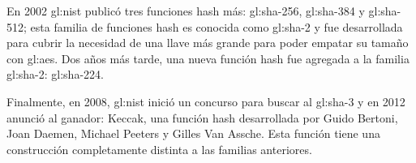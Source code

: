 En 2002 \acrshort{gl:nist} publicó tres funciones hash más:
\acrshort{gl:sha}-256, \acrshort{gl:sha}-384 y \acrshort{gl:sha}-512; esta
familia de funciones hash es conocida como \acrshort{gl:sha}-2 y fue
desarrollada para cubrir la necesidad de una llave más grande para poder
empatar su tamaño con \acrshort{gl:aes}. Dos años más tarde, una nueva
función hash fue agregada a la familia \acrshort{gl:sha}-2:
\acrshort{gl:sha}-224.

Finalmente, en 2008, \acrshort{gl:nist} inició un concurso para buscar al
\acrshort{gl:sha}-3 y en 2012 anunció al ganador: Keccak, una función hash
desarrollada por Guido Bertoni, Joan Daemen, Michael Peeters y Gilles Van
Assche. Esta función tiene una construcción completamente distinta a las
familias anteriores.
